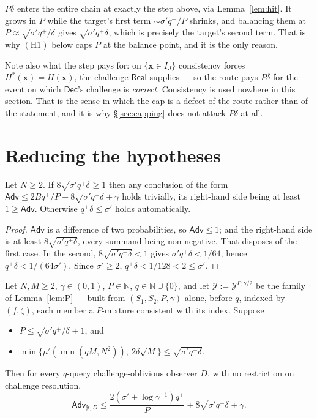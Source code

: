 \documentclass{aicr-solution}
\newcommand{\Adv}{\mathsf{Adv}}
\newcommand{\Real}{\mathsf{Real}}
\newcommand{\Dec}{\mathsf{Dec}}
\newcommand{\vx}{\mathbf{x}}
\begin{document}
\begin{remark}\label{rem:onestep}
$P\delta$ enters the entire chain at exactly the step above, via
Lemma~\ref{lem:hit}. It grows in $P$ while the target's first term
$\sim \sigma' q^{+}/P$ shrinks, and balancing them at
$P \approx \sqrt{\sigma' q^{+}/\delta}$ gives $\sqrt{\sigma' q^{+}\delta}$, which
is precisely the target's second term. That is why $(\mathrm{H1})$ below caps $P$
at the balance point, and it is the only reason.

Note also what the step pays for: on $\{\vx \in I_J\}$ consistency forces
$H^{*}(\vx) = H(\vx)$, the challenge $\Real$ supplies --- so the route pays
$P\delta$ for the event on which $\Dec$'s challenge is \emph{correct}. Consistency
is used nowhere in this section. That is the sense in which the cap is a defect of
the route rather than of the statement, and it is why \S\ref{sec:capping} does not
attack $P\delta$ at all.
\end{remark}

\section{Reducing the hypotheses}\label{sec:reduce}

\begin{lemma}\label{lem:G0}
Let $N \ge 2$. If $8\sqrt{\sigma' q^{+}\delta} \ge 1$ then any conclusion of the
form $\Adv \le 2Bq^{+}/P + 8\sqrt{\sigma' q^{+}\delta} + \gamma$ holds trivially,
its right-hand side being at least $1 \ge \Adv$. Otherwise $q^{+}\delta \le \sigma'$
holds automatically.
\end{lemma}

\begin{proof}
$\Adv$ is a difference of two probabilities, so $\Adv \le 1$; and the right-hand
side is at least $8\sqrt{\sigma' q^{+}\delta}$, every summand being non-negative.
That disposes of the first case. In the second,
$8\sqrt{\sigma' q^{+}\delta} < 1$ gives $\sigma' q^{+}\delta < 1/64$, hence
$q^{+}\delta < 1/(64\sigma')$. Since $\sigma' \ge 2$, $q^{+}\delta < 1/128 < 2
\le \sigma'$.
\end{proof}

\begin{theorem}\label{thm:Epp}
Let $N,M \ge 2$, $\gamma \in (0,1)$, $P \in \mathbb{N}$,
$q \in \mathbb{N} \cup \{0\}$, and let $\mathcal{Y} := \mathcal{Y}^{P,\gamma/2}$ be
the family of Lemma~\ref{lem:P} --- built from $(S_1,S_2,P,\gamma)$ alone, before
$q$, indexed by $(f,\zeta)$, each member a $P$-mixture consistent with its index.
Suppose
\begin{itemize}[leftmargin=1.8em,itemsep=1pt]
\item[$(\mathrm{H1})$] $P \le \sqrt{\sigma' q^{+}/\delta} + 1$, and
\item[$(\mathrm{H2})$] $\min\{\mu'(\min(qM,N^{2})),\ 2\delta\sqrt{M}\}
  \le \sqrt{\sigma' q^{+}\delta}$.
\end{itemize}
Then for every $q$-query challenge-oblivious observer $D$, with no restriction on
challenge resolution,
\[
  \Adv_{\mathcal{Y},D} \le
  \frac{2(\sigma' + \log\gamma^{-1})q^{+}}{P} + 8\sqrt{\sigma' q^{+}\delta}
  + \gamma .
\]
\end{theorem}
\end{document}
